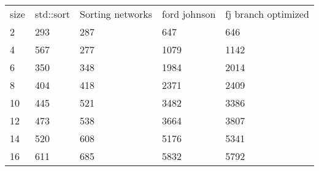 \begin{tabular}{|l|l|l|l|l|}\hline
	size&std::sort&Sorting networks&ford johnson&fj branch optimized\hline\\
	2&293&287&647&646\hline\\
	4&567&277&1079&1142\hline\\
	6&350&348&1984&2014\hline\\
	8&404&418&2371&2409\hline\\
	10&445&521&3482&3386\hline\\
	12&473&538&3664&3807\hline\\
	14&520&608&5176&5341\hline\\
	16&611&685&5832&5792\hline\\
\end{tabular}